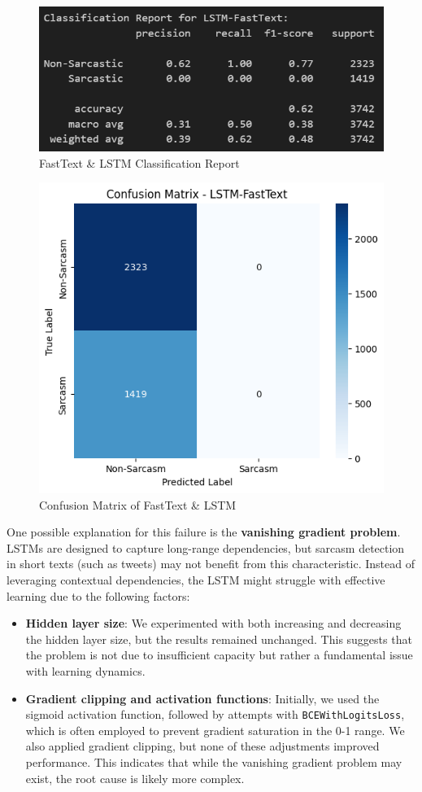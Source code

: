 \documentclass[11pt]{article}
\begin{document}
\begin{figure}[htbp]
    \centering
    \includegraphics[width=.8\linewidth]{pic/LSTM-Fasttext-Report.png}
    \caption{FastText \& LSTM Classification Report}
    \label{fig:ftlstmcr}
\end{figure}
\begin{figure}[htbp]
    \centering
    \includegraphics[width=.8\linewidth]{pic/LSTM-Fasttext-Matrix.png}
    \caption{Confusion Matrix of FastText \& LSTM}
    \label{fig:ftlstmcm}
\end{figure}

One possible explanation for this failure is the \textbf{vanishing gradient problem}. LSTMs are designed to capture long-range dependencies, but sarcasm detection in short texts (such as tweets) may not benefit from this characteristic. Instead of leveraging contextual dependencies, the LSTM might struggle with effective learning due to the following factors:
\begin{itemize}
    \item \textbf{Hidden layer size}: We experimented with both increasing and decreasing the hidden layer size, but the results remained unchanged. This suggests that the problem is not due to insufficient capacity but rather a fundamental issue with learning dynamics.
    \item \textbf{Gradient clipping and activation functions}: Initially, we used the sigmoid activation function, followed by attempts with \texttt{BCEWithLogitsLoss}, which is often employed to prevent gradient saturation in the 0-1 range. We also applied gradient clipping, but none of these adjustments improved performance. This indicates that while the vanishing gradient problem may exist, the root cause is likely more complex.
\end{itemize}
\end{document}
